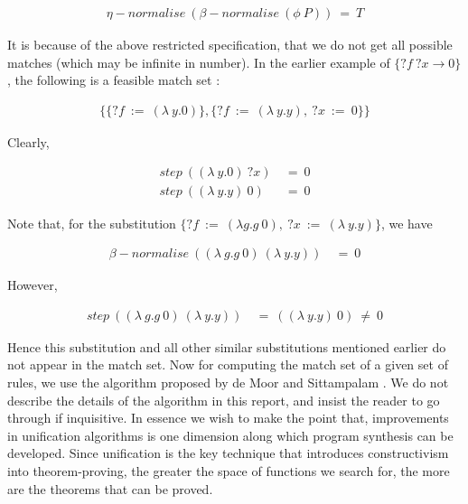 \begin{align*}
\eta -normalise \: (\beta -normalise \: (\phi \: P )) \: = \: T
\end{align*}

\vspace{1em}
\noindent
It is because of the above restricted specification, that we do not get all possible matches (which may be infinite in number). In the earlier example of $\{?f\: ?x \rightarrow 0 \}$, the following is a feasible match set :

\begin{align*}
\{
\{ ?f \: := \: (\lambda \: y.0) \} ,
\{ ?f \: := \: (\lambda \: y.y) , \: ?x \: := \: 0 \}
\}
\end{align*}

\vspace{1em}
\noindent
Clearly,

\begin{align*}
step \: ((\lambda \: y.0) \: ?x) \: &= \: 0\\
step \: ((\lambda \: y.y) \: 0) \: &= \: 0
\end{align*}

\vspace{1em}
\noindent
Note that, for the substitution $\{ ?f \: := \: (\lambda g.g \: 0) , \: ?x \: := \: (\lambda \: y.y) \}$, we have

\begin{align*}
\beta -normalise \: ((\lambda \: g.g \: 0) \: (\lambda \: y.y)) \: &= \:0
\end{align*}

\vspace{1em}
\noindent
However,

\begin{align*}
step \: ((\lambda \: g.g \: 0) \: (\lambda \: y.y)) \: &= \: ((\lambda \: y.y) \: 0) \: \neq \: 0
\end{align*}

\vspace{1em}
\noindent
Hence this substitution and all other similar substitutions mentioned earlier do not appear in the match set. Now for computing the match set of a given set of rules, we use the algorithm proposed by de Moor and Sittampalam \cite{de2001higher}. We do not describe the details of the algorithm in this report, and insist the reader to go through \cite{de2001higher} if inquisitive. In essence we wish to make the point that, improvements in unification algorithms is one dimension along which program synthesis can be developed. Since unification is the key technique that introduces constructivism into theorem-proving, the greater the space of functions we search for, the more are the theorems that can be proved.
